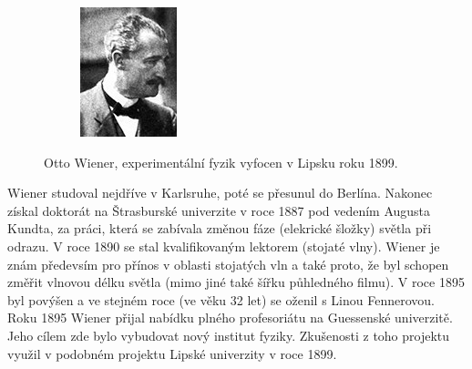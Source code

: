 \documentclass[12pt,a4paper,titlepage,final]{report}
\begin{document}
\begin{figure}[!htb]
\begin{subfigure}[b]{0.4\textwidth}
 		\includegraphics[width=\textwidth]{Otto_Wiener_mini}
	\end{subfigure}
	
	\caption{Otto Wiener, experimentální fyzik  vyfocen v Lipsku roku 1899.}\label{fig:otto}
\end{figure}       

Wiener studoval nejdříve v Karlsruhe, poté se přesunul do Berlína. Nakonec získal doktorát na Štrasburské univerzite v roce 1887
pod vedením Augusta Kundta, za práci, která se zabívala změnou fáze (elekrické šložky) světla při odrazu. V roce 1890 se stal kvalifikovaným lektorem  (stojaté vlny). Wiener je znám předevsím pro přínos v oblasti stojatých vln a také proto, že byl schopen změřit 
vlnovou délku světla (mimo jiné také šířku půhledného filmu). V roce 1895 byl povýšen a ve stejném roce (ve věku 32 let) se oženil s Linou Fennerovou. 
Roku 1895 Wiener přijal nabídku plného profesoriátu na Guessenské univerzitě. Jeho cílem zde bylo vybudovat nový institut fyziky. 
Zkušenosti z toho projektu využil v podobném projektu Lipské univerzity v roce 1899. \cite{encyclopedia_otto}
\end{document}
